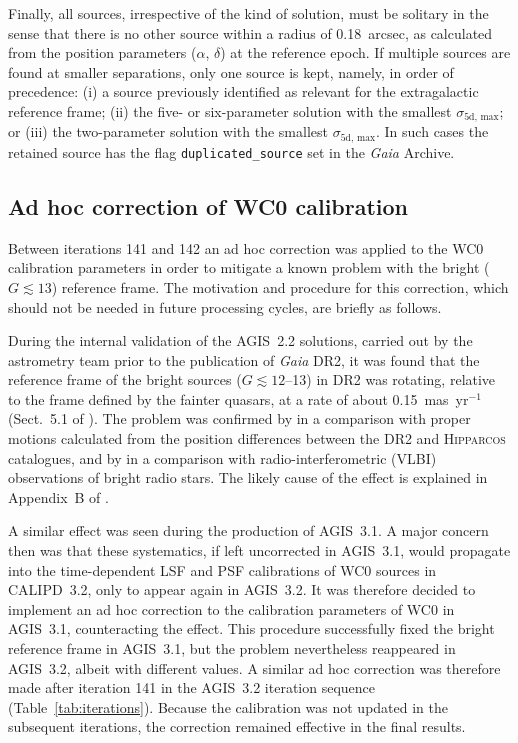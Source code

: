 \documentclass[longauth]{aa} %
\newcommand{\gacs}[1]{{\footnotesize\texttt{#1}}}
\begin{document}
Finally, all sources, irrespective of the kind of solution, must be solitary in the sense that
there is no other source within a radius of 0.18~arcsec, as calculated from the position 
parameters ($\alpha$, $\delta$) at the reference epoch. If multiple sources are found at 
smaller separations, only one source is kept, namely, in order of precedence:
(i) a source previously identified as relevant for the extragalactic reference frame; 
(ii) the five- or six-parameter solution with the smallest $\sigma_\text{5d, max}$; or 
(iii) the two-parameter solution with the smallest $\sigma_\text{5d, max}$. 
In such cases the retained source has the flag \gacs{duplicated\_source} set in the
\textit{Gaia} Archive. 


\subsection{Ad hoc correction of WC0 calibration}
\label{sec:adHoc}   

Between iterations 141 and 142 an ad hoc correction was applied to the WC0
calibration parameters in order to mitigate a known problem with the bright 
($G\lesssim 13$) reference frame. The motivation and procedure for this 
correction, which should not be needed in future processing cycles, are briefly
as follows.

During the internal validation of the AGIS~2.2 solutions, carried out by the
astrometry team prior to the publication of \textit{Gaia} DR2, it was found that
the reference frame of the bright sources ($G\lesssim 12$--13) in DR2 was 
rotating, relative to the frame defined by the fainter quasars, at a rate of 
about 0.15~mas~yr$^{-1}$ (Sect.~5.1 of ).
The problem was confirmed by  in a 
comparison with proper motions calculated from the position differences 
between the DR2 and \textsc{Hipparcos} catalogues, and by
 in a comparison
with radio-interferometric (VLBI) observations of bright radio stars.
The likely cause of the effect is explained in Appendix~B 
of .

A similar effect was seen during the production of AGIS~3.1. A major concern
then was that these systematics, if left uncorrected in AGIS~3.1, would propagate 
into the time-dependent LSF and PSF calibrations of WC0 sources in CALIPD~3.2,
only to appear again in AGIS~3.2. It was therefore decided to implement an 
ad hoc correction to the calibration parameters of WC0 in AGIS~3.1,
counteracting the effect. This procedure successfully fixed the bright reference 
frame in AGIS~3.1, but the problem nevertheless reappeared in AGIS~3.2,
albeit with different values. 
A similar ad hoc correction was therefore made after iteration 141 in the 
AGIS~3.2 iteration sequence (Table~\ref{tab:iterations}). Because the calibration
was not updated in the subsequent iterations, the correction remained effective
in the final results.
\end{document}
